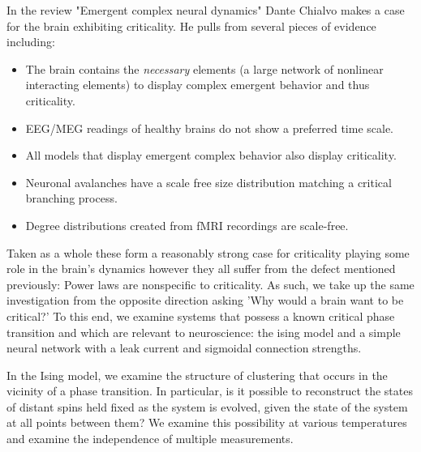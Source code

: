 \documentclass{article} %
\begin{document}
In the review  "Emergent complex neural dynamics\cite{Chialvo2010}" Dante Chialvo
makes a case for the brain exhibiting criticality.  He pulls from several
pieces of evidence including:
\begin{itemize}
\item The brain contains the \emph{necessary} elements (a large network of
nonlinear interacting elements) to display complex emergent behavior and thus
criticality.
\item EEG/MEG readings of healthy brains do not show a preferred time scale.
\item All models that display emergent complex behavior also display
criticality. 
\item Neuronal avalanches have a scale free size distribution matching a
critical branching process.
\item Degree distributions created from fMRI recordings are scale-free.
\end{itemize}
Taken as a whole these form a reasonably strong case for criticality playing 
some role in the brain's dynamics however they all suffer from the defect
mentioned previously: Power laws are nonspecific to criticality.  As such, we
take up the same investigation from the opposite direction asking 'Why would a
brain want to be critical?'  To this end, we examine systems that possess a
known critical phase transition and which are relevant to neuroscience: the
ising model and a simple neural network with a leak current and sigmoidal
connection strengths.

In the Ising model, we examine the structure of clustering that occurs in the
vicinity of a phase transition.  In particular, is it possible to reconstruct
the states of distant spins held fixed as the system is evolved, given the state
of the system at all points between them?  We examine this possibility at
various temperatures and examine the independence of multiple measurements.

\end{document}
